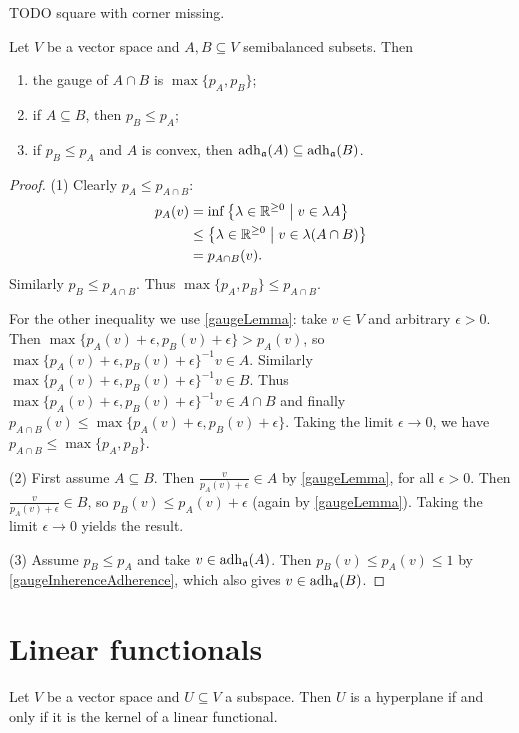 \begin{example}
TODO square with corner missing.
\end{example}



\begin{proposition} \label{gaugeConstructions}
Let $V$ be a vector space and $A,B\subseteq V$ semibalanced subsets. Then
\begin{enumerate}
\item the gauge of $A\cap B$ is $\max\{p_A, p_B\}$;
\item if $A\subseteq B$, then $p_B \leq p_A$;
\item if $p_B \leq p_A$ and $A$ is convex, then $\operatorname{adh}_\mathfrak{a}(A) \subseteq \operatorname{adh}_\mathfrak{a}(B)$.
\end{enumerate}
\end{proposition}
\begin{proof}
(1) Clearly $p_A \leq p_{A\cap B}$:
\begin{align*}
p_A(v) &= \inf\setbuilder{\lambda\in\R^{\geq 0}}{v\in \lambda A} \\
&\leq \setbuilder{\lambda\in\R^{\geq 0}}{v\in \lambda (A\cap B)} \\
&= p_{A\cap B}(v).
\end{align*}
Similarly $p_B \leq p_{A\cap B}$. Thus $\max\{p_A, p_B\} \leq p_{A\cap B}$.

For the other inequality we use \ref{gaugeLemma}: take $v\in V$ and arbitrary $\epsilon > 0$. Then $\max\{p_A(v)+\epsilon, p_B(v)+\epsilon\} > p_A(v)$, so $\max\{p_A(v)+\epsilon, p_B(v)+\epsilon\}^{-1}v\in A$. Similarly $\max\{p_A(v)+\epsilon, p_B(v)+\epsilon\}^{-1}v\in B$. Thus $\max\{p_A(v)+\epsilon, p_B(v)+\epsilon\}^{-1}v \in A\cap B$ and finally $p_{A\cap B}(v) \leq \max\{p_A(v)+\epsilon, p_B(v)+\epsilon\}$. Taking the limit $\epsilon \to 0$, we have $p_{A\cap B} \leq \max\{p_A, p_B\}$.

(2) First assume $A\subseteq B$. Then $\frac{v}{p_A(v)+\epsilon}\in A$ by \ref{gaugeLemma}, for all $\epsilon >0$. Then $\frac{v}{p_A(v)+\epsilon}\in B$, so $p_B(v) \leq p_A(v)+\epsilon$ (again by \ref{gaugeLemma}). Taking the limit $\epsilon\to 0$ yields the result.

(3) Assume $p_B \leq p_A$ and take $v\in \operatorname{adh}_\mathfrak{a}(A)$. Then $p_B(v) \leq p_A(v) \leq 1$ by \ref{gaugeInherenceAdherence}, which also gives $v\in\operatorname{adh}_\mathfrak{a}(B)$.
\end{proof}


\section{Linear functionals}
\begin{lemma} \label{kernelHyperplane}
Let $V$ be a vector space and $U\subseteq V$ a subspace. Then $U$ is a hyperplane \textup{if and only if} it is the kernel of a linear functional.
\end{lemma}

